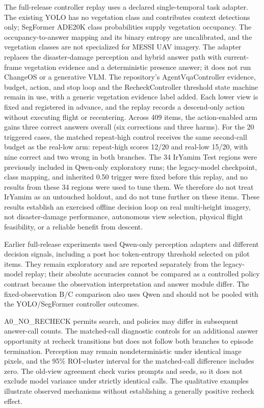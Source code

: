 The full-release controller replay uses a declared single-temporal task adapter. The existing YOLO has no vegetation class and contributes context detections only; SegFormer ADE20K class probabilities supply vegetation occupancy. The occupancy-to-answer mapping and its binary entropy are uncalibrated, and the vegetation classes are not specialized for MESSI UAV imagery. The adapter replaces the disaster-damage perception and hybrid answer path with current-frame vegetation evidence and a deterministic presence answer; it does not run ChangeOS or a generative VLM. The repository's AgentVqaController evidence, budget, action, and stop loop and the RecheckController threshold state machine remain in use, with a generic vegetation evidence label added. Each lower view is fixed and registered in advance, and the replay records a descend-only action without executing flight or recentering. Across 409 items, the action-enabled arm gains three correct answers overall (six corrections and three harms). For the 20 triggered cases, the matched repeat-high control receives the same second-call budget as the real-low arm: repeat-high scores 12/20 and real-low 15/20, with nine correct and two wrong in both branches. The 34 IrYamim Test regions were previously included in Qwen-only exploratory runs; the legacy-model checkpoint, class mapping, and inherited 0.50 trigger were fixed before this replay, and no results from these 34 regions were used to tune them. We therefore do not treat IrYamim as an untouched holdout, and do not tune further on these items. These results establish an exercised offline decision loop on real multi-height imagery, not disaster-damage performance, autonomous view selection, physical flight feasibility, or a reliable benefit from descent.

Earlier full-release experiments used Qwen-only perception adapters and different decision signals, including a post hoc token-entropy threshold selected on pilot items. They remain exploratory and are reported separately from the legacy-model replay; their absolute accuracies cannot be compared as a controlled policy contrast because the observation interpretation and answer module differ. The fixed-observation B/C comparison also uses Qwen and should not be pooled with the YOLO/SegFormer controller outcomes.

A0\_NO\_RECHECK permits search, and policies may differ in subsequent answer-call counts. The matched-call diagnostic controls for an additional answer opportunity at recheck transitions but does not follow both branches to episode termination. Perception may remain nondeterministic under identical image pixels, and the 95\% ROI-cluster interval for the matched-call difference includes zero. The old-view agreement check varies prompts and seeds, so it does not exclude model variance under strictly identical calls. The qualitative examples illustrate observed mechanisms without establishing a generally positive recheck effect.

